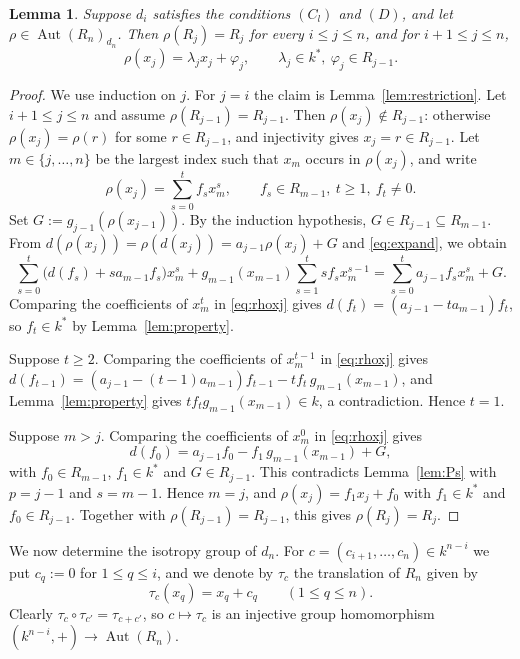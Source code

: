 \documentclass[11pt]{amsart}
\newtheorem{lemma}[theorem]{Lemma}
\theoremstyle{definition}
\theoremstyle{remark}
\numberwithin{equation}{theorem}
\newcommand{\Aut}{\operatorname{Aut}}
\begin{document}
\begin{lemma}\label{lem:triangular}
Suppose $d_i$ satisfies the conditions $(C_l)$ and $(D)$, and let $\rho\in\Aut(R_n)_{d_n}$. Then $\rho(R_j)=R_j$ for
every $i\le j\le n$, and for $i+1\le j\le n$,
\[
\rho(x_j)=\lambda_jx_j+\varphi_j,\qquad \lambda_j\in k^*,\ \varphi_j\in R_{j-1}.
\]
\end{lemma}

\begin{proof}
We use induction on $j$. For $j=i$ the claim is Lemma~\ref{lem:restriction}. Let $i+1\le j\le n$ and
assume $\rho(R_{j-1})=R_{j-1}$. Then $\rho(x_j)\notin R_{j-1}$: otherwise $\rho(x_j)=\rho(r)$ for some
$r\in R_{j-1}$, and injectivity gives $x_j=r\in R_{j-1}$. Let $m\in\{j,\dots,n\}$ be the largest index
such that $x_m$ occurs in $\rho(x_j)$, and write
\[
\rho(x_j)=\sum_{s=0}^tf_sx_m^s,\qquad f_s\in R_{m-1},\ t\ge1,\ f_t\neq0 .
\]
Set $G:=g_{j-1}(\rho(x_{j-1}))$. By the induction hypothesis, $G\in R_{j-1}\subseteq R_{m-1}$. From
$d(\rho(x_j))=\rho(d(x_j))=a_{j-1}\rho(x_j)+G$ and \eqref{eq:expand}, we obtain
\begin{equation}\label{eq:rhoxj}
\sum_{s=0}^t\bigl(d(f_s)+sa_{m-1}f_s\bigr)x_m^s+g_{m-1}(x_{m-1})\sum_{s=1}^tsf_sx_m^{s-1}
=\sum_{s=0}^ta_{j-1}f_sx_m^s+G .
\end{equation}
Comparing the coefficients of $x_m^t$ in \eqref{eq:rhoxj} gives $d(f_t)=(a_{j-1}-ta_{m-1})f_t$, so $f_t\in k^*$ by
Lemma~\ref{lem:property}.

Suppose $t\ge2$. Comparing the coefficients of $x_m^{t-1}$ in \eqref{eq:rhoxj} gives
$d(f_{t-1})=(a_{j-1}-(t-1)a_{m-1})f_{t-1}-tf_t\,g_{m-1}(x_{m-1})$, and Lemma~\ref{lem:property} gives
$tf_tg_{m-1}(x_{m-1})\in k$, a contradiction. Hence $t=1$.

Suppose $m>j$. Comparing the coefficients of $x_m^0$ in \eqref{eq:rhoxj} gives
\[
d(f_0)=a_{j-1}f_0-f_1\,g_{m-1}(x_{m-1})+G,
\]
with $f_0\in R_{m-1}$, $f_1\in k^*$ and $G\in R_{j-1}$. This contradicts Lemma~\ref{lem:Ps} with
$p=j-1$ and $s=m-1$. Hence $m=j$, and $\rho(x_j)=f_1x_j+f_0$ with $f_1\in k^*$ and
$f_0\in R_{j-1}$. Together with $\rho(R_{j-1})=R_{j-1}$, this gives $\rho(R_j)=R_j$.
\end{proof}

We now determine the isotropy group of $d_n$. For $c=(c_{i+1},\dots,c_n)\in k^{n-i}$ we put $c_q:=0$
for $1\le q\le i$, and we denote by $\tau_c$ the translation of $R_n$ given by
\[
\tau_c(x_q)=x_q+c_q\qquad(1\le q\le n).
\]
Clearly $\tau_c\circ\tau_{c'}=\tau_{c+c'}$, so $c\mapsto\tau_c$ is an injective group homomorphism
$(k^{n-i},+)\to\Aut(R_n)$.
\end{document}
